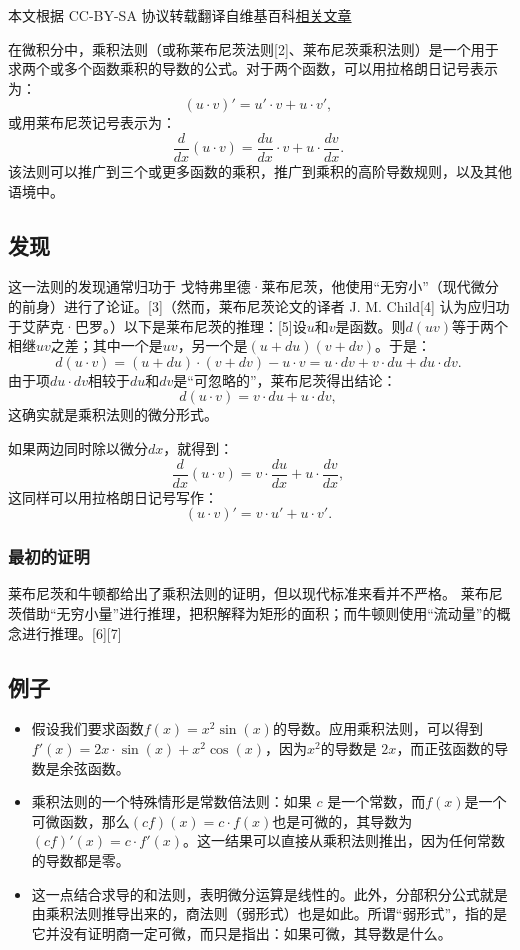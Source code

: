 
本文根据 CC-BY-SA 协议转载翻译自维基百科\href{https://en.wikipedia.org/wiki/Product_rule}{相关文章}

在微积分中，乘积法则（或称莱布尼茨法则[2]、莱布尼茨乘积法则）是一个用于求两个或多个函数乘积的导数的公式。对于两个函数，可以用拉格朗日记号表示为：
$$
(u \cdot v)' = u' \cdot v + u \cdot v',~
$$
或用莱布尼茨记号表示为：
$$
\frac{d}{dx}(u \cdot v) = \frac{du}{dx} \cdot v + u \cdot \frac{dv}{dx}.~
$$
该法则可以推广到三个或更多函数的乘积，推广到乘积的高阶导数规则，以及其他语境中。
\subsection{发现}
这一法则的发现通常归功于 戈特弗里德·莱布尼茨，他使用“无穷小”（现代微分的前身）进行了论证。[3]（然而，莱布尼茨论文的译者 J. M. Child[4] 认为应归功于艾萨克·巴罗。）以下是莱布尼茨的推理：[5]设$u$和$v$是函数。则$d(uv)$等于两个相继$uv$之差；其中一个是$uv$，另一个是$(u+du)(v+dv)$。于是：
$$
d(u \cdot v) = (u+du)\cdot(v+dv) - u\cdot v 
= u \cdot dv + v \cdot du + du \cdot dv.~
$$
由于项$du \cdot dv$相较于$du$和$dv$是“可忽略的”，莱布尼茨得出结论：
$$
d(u \cdot v) = v \cdot du + u \cdot dv,~
$$
这确实就是乘积法则的微分形式。

如果两边同时除以微分$dx$，就得到：
$$
\frac{d}{dx}(u \cdot v) = v \cdot \frac{du}{dx} + u \cdot \frac{dv}{dx},~
$$
这同样可以用拉格朗日记号写作：
$$
(u \cdot v)' = v \cdot u' + u \cdot v'.~
$$
\subsubsection{最初的证明}
莱布尼茨和牛顿都给出了乘积法则的证明，但以现代标准来看并不严格。
莱布尼茨借助“无穷小量”进行推理，把积解释为矩形的面积；而牛顿则使用“流动量”的概念进行推理。[6][7]
\subsection{例子}
\begin{itemize}
\item 假设我们要求函数$f(x) = x^{2}\sin(x)$的导数。应用乘积法则，可以得到$f'(x) = 2x \cdot \sin(x) + x^{2}\cos(x)$，因为$x^{2}$的导数是 $2x$，而正弦函数的导数是余弦函数。
\item 乘积法则的一个特殊情形是常数倍法则：如果 $c$ 是一个常数，而$f(x)$是一个可微函数，那么$(cf)(x) = c \cdot f(x)$也是可微的，其导数为$(cf)'(x) = c \cdot f'(x)$。这一结果可以直接从乘积法则推出，因为任何常数的导数都是零。
\item 这一点结合求导的和法则，表明微分运算是线性的。此外，分部积分公式就是由乘积法则推导出来的，商法则（弱形式）也是如此。所谓“弱形式”，指的是它并没有证明商一定可微，而只是指出：如果可微，其导数是什么。
\end{itemize}
